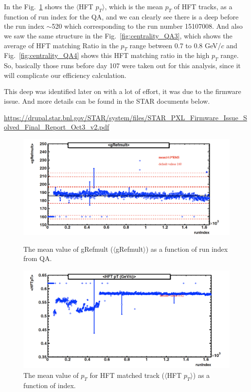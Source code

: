 In the Fig.~\ref{fig:centrality_QA2} shows the $\langle$HFT $p_{T}$$\rangle$, which is the mean $p_{T}$ of HFT tracks, as a function of run index for the QA, and we can clearly see there is a deep before the run index $\sim$520 which corresponding to the run number 15107008. And also we saw the same structure in the Fig.~\ref{fig:centrality_QA3}, which shows the average of HFT matching Ratio in the $p_{T}$ range between 0.7 to 0.8 GeV/$c$ and Fig.~\ref{fig:centrality_QA4} shows this HFT matching ratio in the high $p_{T}$ range. So, basically those runs before day 107 were taken out for this analysis, since it will complicate our efficiency calculation.

This deep was identified later on with a lot of effort, it was due to the firmware issue. And more details can be found in the STAR documents below.

\url{https://drupal.star.bnl.gov/STAR/system/files/STAR_PXL_Firmware_Issue_Solved_Final_Report_Oct3_v2.pdf}

\begin{figure}[htbp]
\begin{minipage}[htbp]{0.52\linewidth}
\centering
\includegraphics[width=1.0\textwidth]{figure/Run14_D0HFT/centrality_grefmult.png}
\caption{The mean value of gRefmult ($\langle$gRefmult$\rangle$) as a function of run index from QA.\label{fig:centrality_QA1}}
\end{minipage}
\hfill
\begin{minipage}[htbp]{0.52\linewidth}
\centering
\includegraphics[width=1.0\textwidth]{figure/Run14_D0HFT/centrality_HFTpt.png} 
\caption{The mean value of $p_{T}$ for HFT matched track ($\langle$HFT $p_{T}$$\rangle$) as a function of index.\label{fig:centrality_QA2}}
\end{minipage}
\end{figure}


